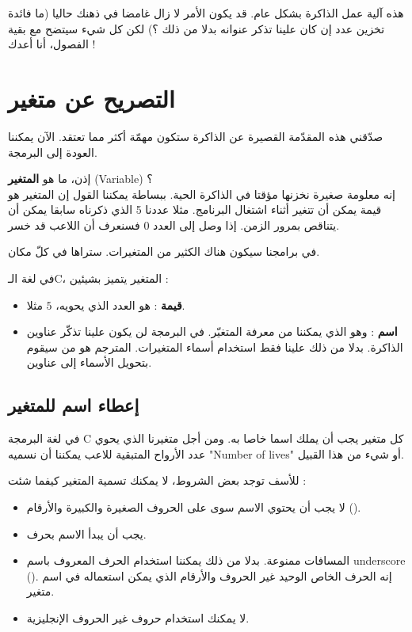 هذه آلية عمل الذاكرة بشكل عام. قد يكون الأمر لا زال غامضا في ذهنك حاليا (ما فائدة تخزين عدد إن كان علينا تذكر عنوانه بدلا من ذلك ؟) لكن كل شيء سيتضح مع بقية الفصول، أنا أعدك !

\section{التصريح عن متغير}

صدّقني هذه المقدّمة القصيرة عن الذاكرة ستكون مهمّة أكثر مما تعتقد. الآن يمكننا العودة إلى البرمجة.

إذن، ما هو
\textbf{المتغير}
(\textenglish{Variable}) ؟\\
إنه معلومة صغيرة نخزنها مؤقتا في الذاكرة الحية. ببساطة يمكننا القول إن المتغير هو قيمة يمكن أن تتغير أثناء اشتغال البرنامج. مثلا عددنا 5 الذي ذكرناه سابقا يمكن أن يتناقص بمرور الزمن. إذا وصل إلى العدد 0 فسنعرف أن اللاعب قد خسر.

في برامجنا سيكون هناك الكثير من المتغيرات. ستراها في كلّ مكان.

في لغة الـ\textenglish{C}،
 المتغير يتميز بشيئين :

\begin{itemize}
  \item \textbf{قيمة}
: هو العدد الذي يحويه، $ 5 $ مثلا.
  \item \textbf{اسم}
: وهو الذي يمكننا من معرفة المتغيّر. في البرمجة لن يكون علينا تذكّر عناوين الذاكرة. بدلا من ذلك علينا فقط استخدام أسماء المتغيرات. المترجم هو من سيقوم بتحويل الأسماء إلى عناوين.
\end{itemize}

\subsection{إعطاء اسم للمتغير}

في لغة البرمجة
\textenglish{C}
كل متغير يجب أن يملك اسما خاصا به. ومن أجل متغيرنا الذي يحوي عدد الأرواح المتبقية للاعب يمكننا أن نسميه
"\textenglish{Number of lives}"
أو شيء من هذا القبيل.

للأسف توجد بعض الشروط، لا يمكنك تسمية المتغير كيفما شئت :

\begin{itemize}
  \item لا يجب أن يحتوي الاسم سوى على الحروف الصغيرة والكبيرة والأرقام
().
  \item يجب أن يبدأ الاسم بحرف.
  \item المسافات ممنوعة. بدلا من ذلك يمكننا استخدام الحرف المعروف باسم
\textenglish{underscore}
 (\InlineCode{\_}).
إنه الحرف الخاص الوحيد غير الحروف والأرقام الذي يمكن استعماله في اسم متغير.
  \item لا يمكنك استخدام حروف غير الحروف الإنجليزية.
\end{itemize}

